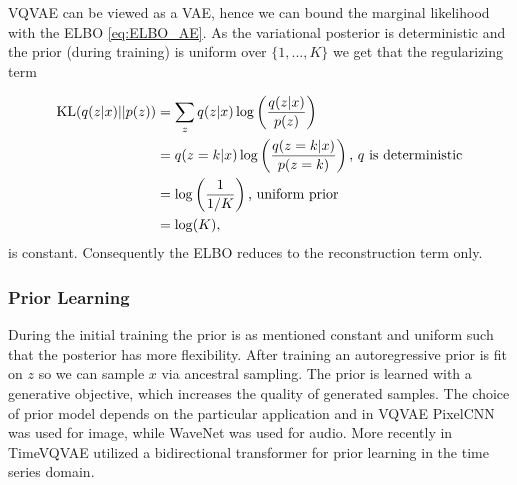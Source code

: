 \documentclass[../../thesis.tex]{subfiles}
\begin{document}
VQVAE can be viewed as a VAE, hence we can bound the marginal likelihood with the ELBO \ref{eq:ELBO_AE}. As the variational posterior is deterministic and the prior (during training) is uniform over $\{1,...,K\}$ we get that the regularizing term

\begin{equation}
    \begin{aligned}
        \operatorname*{\mathrm{KL}}(q(z|x)||p(z)) &= \sum_{z}  q(z|x) \log \left(\frac{q(z|x)}{p(z)}\right) \\
                           &= q(z=k|x) \log \left(\frac{q(z=k|x)}{p(z=k)}\right) \text{, $q$ is deterministic}\\
                           &= \log \left(\frac{1}{1/K}\right) \text{, uniform prior}\\
                           &= \log(K), 
    \end{aligned}
\end{equation}
is constant. Consequently the ELBO reduces to the reconstruction term only. \newline



\subsubsection{Prior Learning}
During the initial training the prior is as mentioned constant and uniform such that the posterior has more flexibility. After training an autoregressive prior is fit on $z$ so we can sample $x$ via ancestral sampling. The prior is learned with a generative objective, which increases the quality of generated samples. The choice of prior model depends on the particular application and in VQVAE PixelCNN \cite{oord2016pixel} was used for image, while WaveNet \cite{oord2016wavenet} was used for audio. More recently in TimeVQVAE \cite{TimeVQVAE} utilized a bidirectional transformer \cite{chang2022maskgit} for prior learning in the time series domain. 
\end{document}
